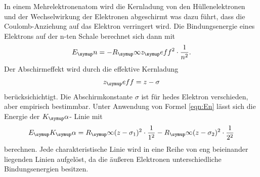 In einem Mehrelektronenatom wird die Kernladung von den Hüllenelektronen und
der Wechselwirkung der Elektronen abgeschirmt was dazu führt, dass die
Coulomb-Anziehung auf das Elektron verringert wird. Die Bindungsenergie eines
Elektrons auf der n-ten Schale berechnet sich dann mit
\begin{equation}
  E_\su{n}=-R_\su{\infty}z_\su{eff}^2\cdot \frac{1}{n^2}.
  \label{eqn:En}
\end{equation}
Der Abschirmeffekt wird durch die effektive Kernladung
\begin{equation*}
  z_\su{eff}=z-\sigma
\end{equation*}
berücksichichtigt. Die Abschirmkonstante $\sigma$ ist für hedes Elektron
verschieden, aber empirisch bestimmbar.
Unter Anwendung von Formel \eqref{eqn:En} lässt sich die Energie der $K_\su{\alpha}$-
Linie mit
\begin{equation}
  E_\su{K_\su{\alpha}}=R_\su{\infty}(z-\sigma_1)^2\cdot\frac{1}{1^2}
  -R_\su{\infty}(z-\sigma_2)^2\cdot\frac{1}{2^2}
  \label{eqn:EKAlpha}
\end{equation}
berechnen. Jede charakteristische Linie wird in eine Reihe von eng beieinander
liegenden Linien aufgelöst, da die äußeren Elektronen unterschiedliche
Bindungsenergien besitzen.
